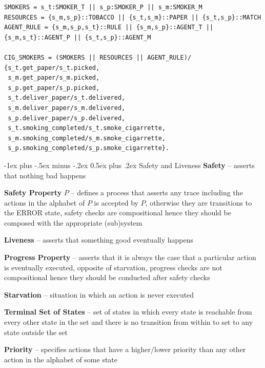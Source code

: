 \documentclass[letterpaper, 8pt]{extarticle}
\makeatletter
\renewcommand{\section}{\@startsection{section}{1}{0mm}%
                                {-1ex plus -.5ex minus -.2ex}%
                                {0.5ex plus .2ex}%
                                {\normalfont\normalsize\bfseries}}
\makeatother
\begin{document}
\begin{multicols*}{5}
\begin{lstlisting}
SMOKERS = s_t:SMOKER_T || s_p:SMOKER_P || s_m:SMOKER_M
RESOURCES = {s_m,s_p}::TOBACCO || {s_t,s_m}::PAPER || {s_t,s_p}::MATCH
AGENT_RULE = {s_m,s_p,s_t}::RULE || {s_m,s_p}::AGENT_T || {s_m,s_t}::AGENT_P || {s_t,s_p}::AGENT_M

CIG_SMOKERS = (SMOKERS || RESOURCES || AGENT_RULE)/
{s_t.get_paper/s_t.picked,
 s_m.get_paper/s_m.picked,
 s_p.get_paper/s_p.picked,
 s_t.deliver_paper/s_t.delivered,
 s_m.deliver_paper/s_m.delivered,
 s_p.deliver_paper/s_p.delivered,
 s_t.smoking_completed/s_t.smoke_cigarrette,
 s_m.smoking_completed/s_m.smoke_cigarrette,
 s_p.smoking_completed/s_p.smoke_cigarrette}.
\end{lstlisting}

  \section{Safety and Liveness}
  \textbf{Safety} -- asserts that nothing bad happens

  \textbf{Safety Property} $P$ -- defines a process that asserts any trace including the actions in the alphabet of $P$ is accepted by $P$, otherwise they are transitions to the ERROR state, safety checks are compositional hence they should be composed with the appropriate (sub)system

  \textbf{Liveness} -- asserts that something good eventually happens

  \textbf{Progress Property} -- asserts that it is always the case that a particular action is eventually executed, opposite of starvation, progress checks are not compositional hence they should be conducted after safety checks

  \textbf{Starvation} -- situation in which an action is never executed

  \textbf{Terminal Set of States} -- set of states in which every state is reachable from every other state in the set and there is no transition from within to set to any state outside the set

  \textbf{Priority} -- specifies actions that have a higher/lower priority than any other action in the alphabet of some state



\end{multicols*}
\end{document}

